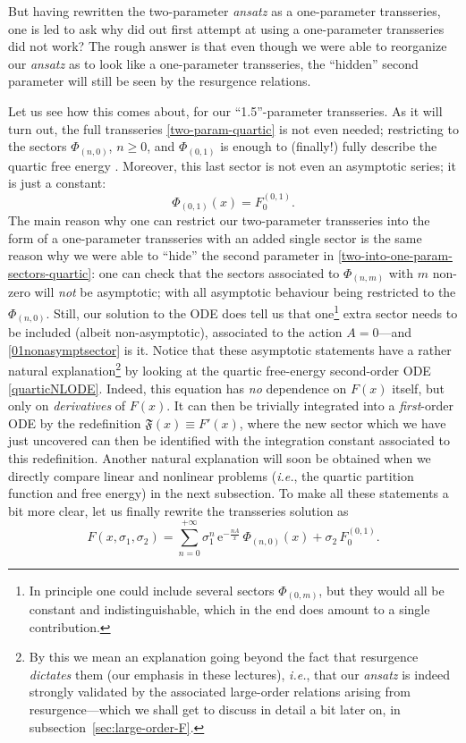 \documentclass[11pt,a4paper]{article}
\newcommand{\be}{\begin{equation}}
\newcommand{\ee}{\end{equation}}
\newcommand{\rme}{{\mathrm{e}}}
\begin{document}
But having rewritten the two-parameter \textit{ansatz} as a one-parameter transseries, one is led to ask why did out first attempt at using a one-parameter transseries did not work? The rough answer is that even though we were able to reorganize our \textit{ansatz} as to look like a one-parameter transseries, the ``hidden'' second parameter will still be seen by the resurgence relations.

Let us see how this comes about, for our ``1.5''-parameter transseries. As it will turn out, the full transseries \eqref{two-param-quartic} is not even needed; restricting to the sectors $\Phi_{(n,0)}$, $n\ge0$, and $\Phi_{(0,1)}$ is enough to (finally!) fully describe the quartic free energy . Moreover, this last sector is not even an asymptotic series; it is just a constant:
%
\be
\label{01nonasymptsector}
\Phi_{(0,1)}(x) = F_0^{(0,1)}.
\ee
%
\noindent
The main reason why one can restrict our two-parameter transseries into the form of a one-parameter transseries with an added single sector is the same reason why we were able to ``hide'' the second parameter in \eqref{two-into-one-param-sectors-quartic}: one can check that the sectors associated to $\Phi_{(n,m)}$ with $m$ non-zero will \textit{not} be asymptotic; with all asymptotic behaviour being restricted to the $\Phi_{(n,0)}$. Still, our solution to the ODE does tell us that one\footnote{In principle one could include several sectors $\Phi_{(0,m)}$, but they would all be constant and indistinguishable, which in the end does amount to a single contribution.} extra sector needs to be included (albeit non-asymptotic), associated to the action $A=0$---and \eqref{01nonasymptsector} is it. Notice that these asymptotic statements have a rather natural explanation\footnote{By this we mean an explanation going beyond the fact that resurgence \textit{dictates} them (our emphasis in these lectures), \textit{i.e.}, that our \textit{ansatz} is indeed strongly validated by the associated large-order relations arising from resurgence---which we shall get to discuss in detail a bit later on, in subsection~\ref{sec:large-order-F}.} by looking at the quartic free-energy second-order ODE \eqref{quarticNLODE}. Indeed, this equation has \textit{no} dependence on $F(x)$ itself, but only on \textit{derivatives} of $F(x)$. It can then be trivially integrated into a \textit{first}-order ODE by the redefinition $\mathfrak{F} (x) \equiv F' (x)$, where the new sector which we have just uncovered can then be identified with the integration constant associated to this redefinition. Another natural explanation will soon be obtained when we directly compare linear and nonlinear problems (\textit{i.e.}, the quartic partition function and free energy) in the next subsection. To make all these statements a bit more clear, let us finally rewrite the transseries solution as
%
\be
\label{one-point-five-transseries}
F (x, \sigma_1, \sigma_2) = \sum_{n=0}^{+\infty} \sigma_1^n\, \rme^{-\frac{n A}{x}}\, \Phi_{(n,0)} (x) + \sigma_2\, F_0^{(0,1)}.
\ee
\end{document}
